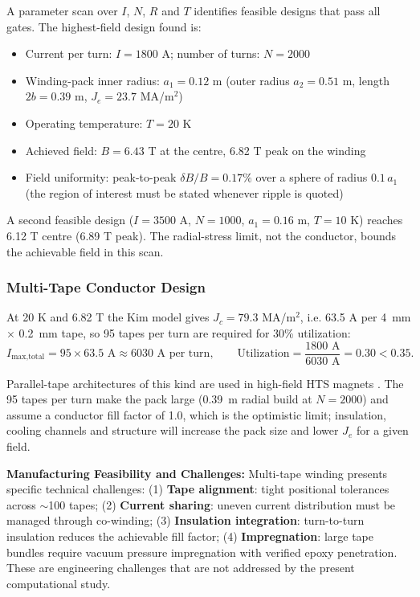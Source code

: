\documentclass[aps,prb,preprint,amsmath,amssymb]{revtex4-2}
\begin{document}
A parameter scan over $I$, $N$, $R$ and $T$ identifies feasible designs that pass all gates. The highest-field design found is:

\begin{itemize}
\item Current per turn: $I = 1800$ A; number of turns: $N = 2000$
\item Winding-pack inner radius: $a_1 = 0.12$ m (outer radius $a_2 = 0.51$ m, length $2b = 0.39$ m, $J_e = 23.7$ MA/m$^2$)
\item Operating temperature: $T = 20$ K
\item Achieved field: $B = 6.43$ T at the centre, 6.82 T peak on the winding
\item Field uniformity: peak-to-peak $\delta B/B = 0.17\%$ over a sphere of radius $0.1\,a_1$ (the region of interest must be stated whenever ripple is quoted)
\end{itemize}

A second feasible design ($I = 3500$ A, $N = 1000$, $a_1 = 0.16$ m, $T = 10$ K) reaches 6.12 T centre (6.89 T peak). The radial-stress limit, not the conductor, bounds the achievable field in this scan.

\subsubsection{Multi-Tape Conductor Design}

At 20 K and 6.82 T the Kim model gives $J_c = 79.3$ MA/m$^2$, i.e. 63.5 A per 4~mm $\times$ 0.2~mm tape, so 95 tapes per turn are required for 30\% utilization:
\begin{equation}
I_{\text{max,total}} = 95 \times 63.5 \text{ A} \approx 6030 \text{ A per turn}, \qquad \text{Utilization} = \frac{1800 \text{ A}}{6030 \text{ A}} = 0.30 < 0.35 .
\end{equation}

Parallel-tape architectures of this kind are used in high-field HTS magnets \cite{hahn2019,larbalestier2014rebco}. The 95 tapes per turn make the pack large (0.39~m radial build at $N=2000$) and assume a conductor fill factor of 1.0, which is the optimistic limit; insulation, cooling channels and structure will increase the pack size and lower $J_e$ for a given field.

\textbf{Manufacturing Feasibility and Challenges:} Multi-tape winding presents specific technical challenges: (1) \textbf{Tape alignment}: tight positional tolerances across $\sim$100 tapes; (2) \textbf{Current sharing}: uneven current distribution must be managed through co-winding; (3) \textbf{Insulation integration}: turn-to-turn insulation reduces the achievable fill factor; (4) \textbf{Impregnation}: large tape bundles require vacuum pressure impregnation with verified epoxy penetration. These are engineering challenges that are not addressed by the present computational study.
\end{document}
